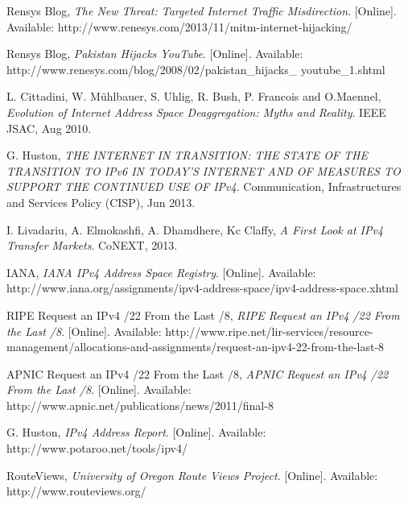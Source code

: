 \documentclass[11pt,a4paper]{scrreprt}
\begin{document}

\renewcommand\bibname{\chapter{References}}
\begin{thebibliography}{count}



    Rensys Blog,
    \emph{The New Threat: Targeted Internet Traffic Misdirection}.
    [Online]. Available: http://www.renesys.com/2013/11/mitm-internet-hijacking/


    Rensys Blog,
    \emph{Pakistan Hijacks YouTube}.
    [Online]. Available: http://www.renesys.com/blog/2008/02/pakistan\_hijacks\_
youtube\_1.shtml

	L. Cittadini, W. Mühlbauer, S. Uhlig, R. Bush, P. Francois and O.Maennel,
	\emph{Evolution of Internet Address Space Deaggregation: Myths and Reality}.
	IEEE JSAC, Aug 2010.

	G. Huston,
	\emph{THE INTERNET IN TRANSITION: THE STATE OF THE TRANSITION TO IPv6 IN TODAY'S
INTERNET AND OF MEASURES TO SUPPORT THE CONTINUED USE OF IPv4}.
	Communication, Infrastructures and Services Policy (CISP), Jun 2013.
	

	I. Livadariu, A. Elmokashfi, A. Dhamdhere, Kc Claffy,
	\emph{A First Look at IPv4 Transfer Markets}.
	CoNEXT, 2013.
	
	IANA,
	\emph{IANA IPv4 Address Space Registry}.
	[Online]. Available: http://www.iana.org/assignments/ipv4-address-space/ipv4-address-space.xhtml
	
	RIPE Request an IPv4 /22 From the Last /8,
	\emph{RIPE Request an IPv4 /22 From the Last /8}.
	[Online]. Available: http://www.ripe.net/lir-services/resource-management/allocations-and-assignments/request-an-ipv4-22-from-the-last-8

	APNIC Request an IPv4 /22 From the Last /8,
	\emph{APNIC Request an IPv4 /22 From the Last /8}.
	[Online]. Available: http://www.apnic.net/publications/news/2011/final-8
	
	G. Huston,
	\emph{IPv4 Address Report}.
	[Online]. Available: http://www.potaroo.net/tools/ipv4/

	RouteViews,
	\emph{University of Oregon Route Views Project}.
	[Online]. Available: http://www.routeviews.org/
	

\end{thebibliography}
\end{document}

